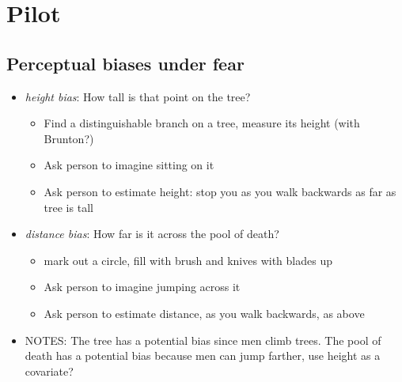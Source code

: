 \documentclass{article}
\begin{document}
\section{Pilot}

\subsection{Perceptual biases under fear}

\begin{itemize}
\item \emph{height bias}:  How tall is that point on the tree?  

\begin{itemize}

\item Find a distinguishable branch on a tree, measure its height (with Brunton?) 

\item Ask person to imagine sitting on it

\item Ask person to estimate height: stop you as you walk backwards as far as tree is tall

\end{itemize}

\item \emph{distance bias}:  How far is it across the pool of death?

\begin{itemize}

\item mark out a circle, fill with brush and knives with blades up

\item Ask person to imagine jumping across it 

\item Ask person to estimate distance, as you walk backwards, as above

\end{itemize}

\item NOTES: The tree has a potential bias since men climb trees.  The
  pool of death has a potential bias because men can jump farther, use
  height as a covariate?  
  
\end{itemize}

\end{document}
